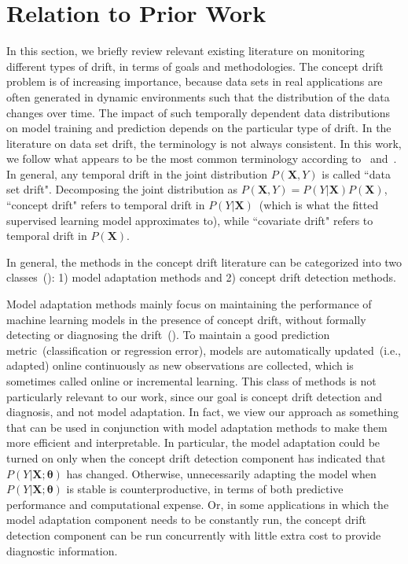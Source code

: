 \documentclass[twoside,11pt]{article}
\begin{document}
\section{Relation to Prior Work}
\label{s:review}
In this section, we briefly review relevant existing literature on monitoring different types of drift, in terms of goals and methodologies. The concept drift problem is of increasing importance, because data sets in real applications are often generated in dynamic environments such that the distribution of the data changes over time. The impact of such temporally dependent data distributions on model training and prediction depends on the particular type of drift. In the literature on data set drift, the terminology is not always consistent. In this work, we follow what appears to be the most common terminology according to~\cite{moreno2012unifying} and~\cite{vzliobaite2016overview}. In general, any temporal drift in the joint distribution $P(\bm {X}, Y)$ is called ``data set drift". Decomposing the joint distribution as $P(\bm{X}, Y) = P(Y|\bm{X})P(\bm {X})$, ``concept drift" refers to temporal drift in $P(Y|\bm{X})$~(which is what the fitted supervised learning model approximates to), while ``covariate drift" refers to temporal drift in $P(\bm{X})$.

In general, the methods in the concept drift literature can be categorized into two classes~(\cite{tsymbal2004problem}): 1) model adaptation methods and 2) concept drift detection methods.

Model adaptation methods mainly focus on maintaining the performance of machine learning models in the presence of concept drift, without formally detecting or diagnosing the drift~(\cite{wang2003mining,tsymbal2008dynamic,gonccalves2014comparative,barros2018large}). To maintain a good prediction metric~(classification or regression error), models are automatically updated~(i.e., adapted) online continuously as new observations are collected, which is sometimes called online or incremental learning. This class of methods is not particularly relevant to our work, since our goal is concept drift detection and diagnosis, and not model adaptation. In fact, we view our approach as something that can be used in conjunction with model adaptation methods to make them more efficient and interpretable. In particular, the model adaptation could be turned on only when the concept drift detection component has indicated that $P(Y|\bm{X};\bm{\theta})$ has changed. Otherwise, unnecessarily adapting the model when $P(Y|\bm{X}; \bm{\theta})$ is stable is counterproductive, in terms of both predictive performance and computational expense. Or, in some applications in which the model adaptation component needs to be constantly run, the concept drift detection component can be run concurrently with little extra cost to provide diagnostic information.
\end{document}
